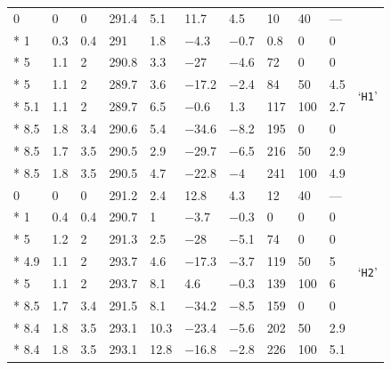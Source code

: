 \begin{longtable}{llll llll lll}
	\num{0} & \num{0}  &  \num{0} & \num{291.4} & \num{5.1} & \num{11.7} & \num{4.5} & \num{10} & \num{40} & --- & \multirow{8}{*}{`\texttt{H1}'} \\*
	\num{1} & \num{.3} &  \num{.4} & \num{291} & \num{1.8} & \num{-4.3} & \num{-.7} & \num{.8} & \num{0} & \num{0} &  \\*
	\num{5} & \num{1.1} &  \num{2} & \num{290.8} & \num{3.3} & \num{-27} & \num{-4.6} & \num{72} & \num{0} & \num{0} & \\*
	\num{5} & \num{1.1} &  \num{2} & \num{289.7} & \num{3.6} & \num{-17.2} & \num{-2.4} & \num{84} & \num{50} & \num{4.5} & \\*
	\num{5.1} & \num{1.1} &  \num{2} & \num{289.7} & \num{6.5} & \num{-.6} & \num{1.3} & \num{117} & \num{100} & \num{2.7} & \\*
	\num{8.5} & \num{1.8} & \num{3.4} & \num{290.6} & \num{5.4} & \num{-34.6} & \num{-8.2} & \num{195} & \num{0} & \num{0} & \\*
	\num{8.5} & \num{1.7} &  \num{3.5} & \num{290.5} & \num{2.9} & \num{-29.7} & \num{-6.5} & \num{216} & \num{50} & \num{2.9} & \\*
	\num{8.5} & \num{1.8} &  \num{3.5} & \num{290.5} & \num{4.7} & \num{-22.8} & \num{-4} & \num{241} & \num{100} & \num{4.9} & \\
	
	 \hdashline
	\num{0} & \num{0} &  \num{0} & \num{291.2} & \num{2.4} & \num{12.8} & \num{4.3} & \num{12} & 40 & --- & \multirow{8}{*}{`\texttt{H2}'} \\*
	\num{1} & \num{.4} & \num{.4} & \num{290.7} & \num{1} & \num{-3.7} & \num{-.3} & \num{0} & \num{0} & \num{0} & \\*
	\num{5} & \num{1.2} & \num{2} & \num{291.3} & \num{2.5} & \num{-28} & \num{-5.1} & \num{74} & \num{0} & \num{0} & \\*
	\num{4.9} & \num{1.1} &  \num{2} & \num{293.7} & \num{4.6} & \num{-17.3} & \num{-3.7} & \num{119} & \num{50} & \num{5} & \\*
	\num{5} & \num{1.1} &  \num{2} & \num{293.7} & \num{8.1} & \num{4.6} & \num{-.3} & \num{139} & \num{100} & \num{6} & \\*
	\num{8.5} & \num{1.7} & \num{3.4} & \num{291.5} & \num{8.1} & \num{-34.2} & \num{-8.5} & \num{159} & \num{0} & \num{0} & \\*
	\num{8.4} & \num{1.8} &  \num{3.5} & \num{293.1} & \num{10.3} & \num{-23.4} & \num{-5.6} & \num{202} & \num{50} & \num{2.9} & \\*
	\num{8.4} & \num{1.8} &  \num{3.5} & \num{293.1} & \num{12.8} & \num{-16.8} & \num{-2.8} & \num{226} & \num{100} & \num{5.1} & \\
	

\end{longtable}
